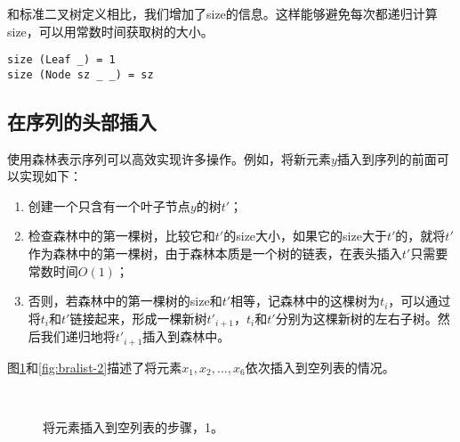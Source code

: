 \documentclass[UTF8]{article}
\begin{document}
和标准二叉树定义相比，我们增加了size的信息。这样能够避免每次都递归计算size，可以用常数时间获取树的大小。

\begin{lstlisting}
size (Leaf _) = 1
size (Node sz _ _) = sz
\end{lstlisting}

\subsection{在序列的头部插入}
使用森林表示序列可以高效实现许多操作。例如，将新元素$y$插入到序列的前面可以实现如下：

\begin{enumerate}
\item 创建一个只含有一个叶子节点$y$的树$t'$；
\item 检查森林中的第一棵树，比较它和$t'$的size大小，如果它的size大于$t'$的，就将$t'$作为森林中的第一棵树，由于森林本质是一个树的链表，在表头插入$t'$只需要常数时间$O(1)$；
\item 否则，若森林中的第一棵树的size和$t'$相等，记森林中的这棵树为$t_i$，可以通过将$t_i$和$t'$链接起来，形成一棵新树$t'_{i+1}$，$t_i$和$t'$分别为这棵新树的左右子树。然后我们递归地将$t'_{i+1}$插入到森林中。
\end{enumerate}

图\ref{fig:bralist-1}和\ref{fig:bralist-2}描述了将元素$x_1, x_2, ..., x_6$依次插入到空列表的情况。

\begin{figure}[htbp]
  \centering
   \\
  \caption{将元素插入到空列表的步骤，1。} \label{fig:bralist-1}
\end{figure}
\end{document}
